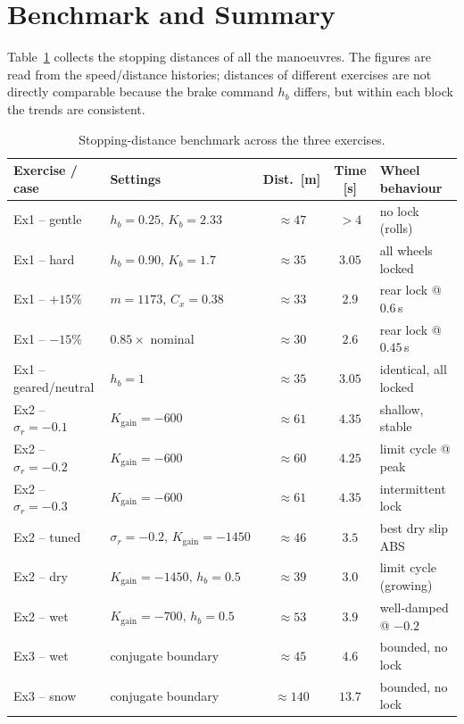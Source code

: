 \section{Benchmark and Summary}
\label{sec:bench}
Table~\ref{tab:bench} collects the stopping distances of all the
manoeuvres. The figures are read from the speed/distance histories;
distances of different exercises are not directly comparable because the
brake command $h_b$ differs, but within each block the trends are
consistent.

\begin{table}[H]
    \centering
    \footnotesize
    \begin{tabular}{llccl}
        \toprule
        \textbf{Exercise / case} & \textbf{Settings} &
        \textbf{Dist.\ [m]} & \textbf{Time [s]} & \textbf{Wheel behaviour} \\
        \midrule
        Ex1 -- gentle      & $h_b{=}0.25,\,K_b{=}2.33$ & $\approx47$ & $>4$    & no lock (rolls) \\
        Ex1 -- hard        & $h_b{=}0.90,\,K_b{=}1.7$  & $\approx35$ & $3.05$  & all wheels locked \\
        Ex1 -- $+15\%$     & $m{=}1173,\,C_x{=}0.38$   & $\approx33$ & $2.9$   & rear lock @ $0.6$\,s \\
        Ex1 -- $-15\%$     & $0.85\times$ nominal      & $\approx30$ & $2.6$   & rear lock @ $0.45$\,s \\
        Ex1 -- geared/neutral & $h_b{=}1$              & $\approx35$ & $3.05$  & identical, all locked \\
        \midrule
        Ex2 -- $\sigma_r{=}{-}0.1$ & $K_\mathrm{gain}{=}{-}600$  & $\approx61$ & $4.35$ & shallow, stable \\
        Ex2 -- $\sigma_r{=}{-}0.2$ & $K_\mathrm{gain}{=}{-}600$  & $\approx60$ & $4.25$ & limit cycle @ peak \\
        Ex2 -- $\sigma_r{=}{-}0.3$ & $K_\mathrm{gain}{=}{-}600$  & $\approx61$ & $4.35$ & intermittent lock \\
        Ex2 -- tuned       & $\sigma_r{=}{-}0.2,\,K_\mathrm{gain}{=}{-}1450$ & $\approx46$ & $3.5$ & best dry slip ABS \\
        Ex2 -- dry         & $K_\mathrm{gain}{=}{-}1450,\,h_b{=}0.5$ & $\approx39$ & $3.0$ & limit cycle (growing) \\
        Ex2 -- wet         & $K_\mathrm{gain}{=}{-}700,\,h_b{=}0.5$  & $\approx53$ & $3.9$ & well-damped @ $-0.2$ \\
        \midrule
        Ex3 -- wet         & conjugate boundary        & $\approx45$  & $4.6$  & bounded, no lock \\
        Ex3 -- snow        & conjugate boundary        & $\approx140$ & $13.7$ & bounded, no lock \\
        \bottomrule
    \end{tabular}
    \caption{Stopping-distance benchmark across the three exercises.}
    \label{tab:bench}
\end{table}

